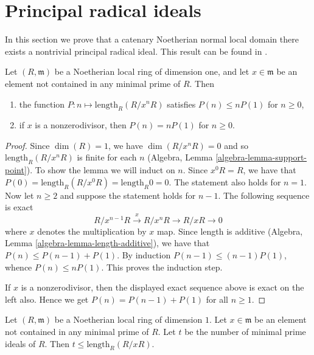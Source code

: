 \section{Principal radical ideals}
\label{section-principal-radical-ideals}

\noindent
In this section we prove that a catenary Noetherian normal local domain
there exists a nontrivial principal radical ideal. This result can be
found in \cite{Artin-Lipman}.

\begin{lemma}
\label{lemma-polypoly}
Let $(R,\mathfrak m)$ be a Noetherian local ring of dimension one, and
let $x\in\mathfrak m$ be an element not contained in any minimal prime
of $R$. Then
\begin{enumerate}
\item the function $P : n \mapsto \text{length}_R(R/x^n R)$
satisfies $P(n) \leq n P(1)$ for $n \geq 0$,
\item if $x$ is a nonzerodivisor, then $P(n) = nP(1)$ for $n \geq 0$.
\end{enumerate}
\end{lemma}

\begin{proof}
Since $\dim(R) = 1$, we have $\dim(R/x^n R) = 0$
and so $\text{length}_R(R/x^n R)$ is finite for each $n$
(Algebra, Lemma \ref{algebra-lemma-support-point}).
To show the lemma we will induct on $n$. Since $x^0 R = R$, we have that
$P(0) = \text{length}_R(R/x^0R) = \text{length}_R 0 = 0$.
The statement also holds for $n = 1$.
Now let $n \geq 2$ and suppose the statement holds for $n - 1$.
The following sequence is exact
$$
R/x^{n-1}R \xrightarrow{x} R/x^nR \to R/xR \to 0
$$
where $x$ denotes the multiplication by $x$ map.
Since length is additive
(Algebra, Lemma \ref{algebra-lemma-length-additive}),
we have that $P(n) \leq P(n - 1) + P(1)$. By induction
$P(n - 1) \leq (n - 1)P(1)$, whence $P(n) \leq nP(1)$.
This proves the induction step.

\medskip\noindent
If $x$ is a nonzerodivisor, then the displayed exact sequence
above is exact on the left also. Hence we get
$P(n) = P(n - 1) + P(1)$ for all $n \geq 1$.
\end{proof}

\begin{lemma}
\label{lemma-minprimespoly}
Let $(R, \mathfrak m)$ be a Noetherian local ring of dimension $1$.
Let $x \in \mathfrak m$ be an element not contained in any minimal
prime of $R$. Let $t$ be the number of minimal prime ideals of $R$.
Then $t \leq \text{length}_R(R/xR)$.
\end{lemma}

